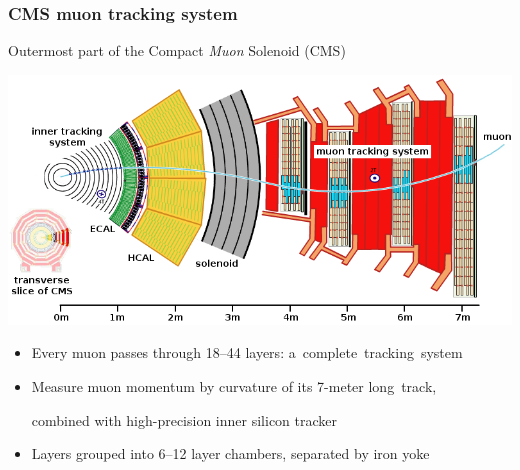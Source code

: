 \documentclass[compress]{beamer}
\begin{document}
\begin{frame}
\frametitle{CMS muon tracking system}

\vfill \vfill Outermost part of the Compact {\it Muon} Solenoid (CMS)

\includegraphics[width=\linewidth]{cms_slice.png}

\vfill\vfill\begin{itemize}
\item Every muon passes through 18--44 layers: \mbox{a complete tracking system\hspace{-1 cm}}
\item Measure muon momentum by curvature of its 7-meter \mbox{long track,\hspace{-1 cm}}

combined with high-precision inner silicon tracker
\item Layers grouped into 6--12 layer chambers, separated by iron yoke
\end{itemize}
\end{frame}
\end{document}
